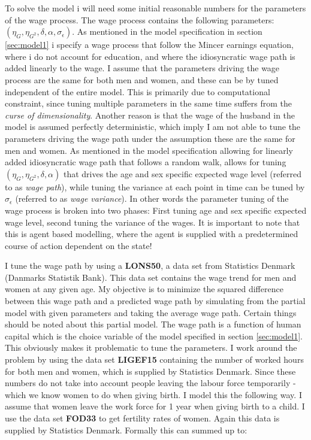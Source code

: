 To solve the model i will need some initial reasonable numbers for the parameters of the wage process. The wage process contains the following parameters: $(\eta_G, \eta_{G^2}, \delta, \alpha, \sigma_{\epsilon})$. As mentioned in the model specification in section \ref{sec:model1} i specify a wage process that follow the Mincer earnings equation, where i do not account for education, and where the idiosyncratic wage path is added linearly to the wage. I assume that the parameters driving the wage process are the same for both men and women, and these can be by tuned independent of the entire model. This is primarily due to computational constraint, since tuning multiple parameters in the same time suffers from the \textit{curse of dimensionality}. Another reason is that the wage of the husband in the model is assumed perfectly deterministic, which imply I am not able to tune the parameters driving the wage path under the assumption these are the same for men and women. As mentioned in the model specification allowing for linearly added idiosyncratic wage path that follows a random walk, allows for tuning $(\eta_G, \eta_{G^2}, \delta, \alpha)$ that drives the age and sex specific expected wage level (referred to as \textit{wage path}), while tuning the variance at each point in time can be tuned by $\sigma_\epsilon$ (referred to as \textit{wage variance}). In other words the parameter tuning of the wage process is broken into two phases: First tuning age and sex specific expected wage level, second tuning the variance of the wages. It is important to note that this is agent based modelling, where the agent is supplied with a predetermined course of action dependent on the state! 

I tune the wage path by using a \textbf{LONS50}, a data set from Statistics Denmark (Danmarks Statistik Bank). This data set contains the wage trend for men and women at any given age. My objective is to minimize the squared difference between this wage path and a predicted wage path by simulating from the partial model with given parameters and taking the average wage path. Certain things should be noted about this partial model. The wage path is a function of human capital which is the choice variable of the model specified in section \ref{sec:model1}. This obviously makes it problematic to tune the parameters. I work around the problem by using the data set \textbf{LIGEF15} containing the number of worked hours for both men and women, which is supplied by Statistics Denmark. Since these numbers do not take into account people leaving the labour force temporarily - which we know women to do when giving birth. I model this the following way. I assume that women leave the work force for 1 year when giving birth to a child. I use the data set \textbf{FOD33} to get fertility rates of women. Again this data is supplied by Statistics Denmark. Formally this can summed up to:


